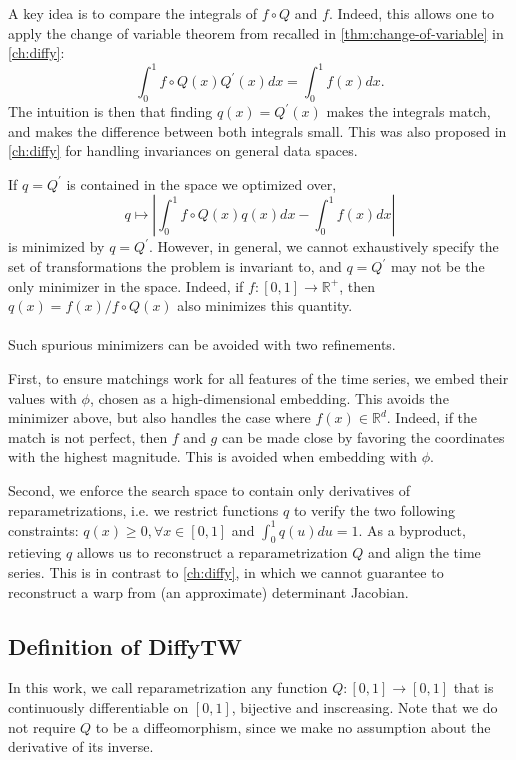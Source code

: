 A key idea is to compare the integrals of $f\circ Q$ and $f$. Indeed, this allows one to apply the change of variable theorem from \cite{aliprantis1998principles} recalled in \cref{thm:change-of-variable} in \cref{ch:diffy}:
\begin{equation}
    \int_0^1 f\circ Q(x)Q^\prime(x)dx = \int_0^1 f(x)dx.
\end{equation}
The intuition is then that finding $q(x) = Q^\prime(x)$ makes the integrals match, and makes the difference between both integrals small. This was also proposed in \cref{ch:diffy} for handling invariances on general data spaces.

If $q = Q^\prime$ is contained in the space we optimized over,
\begin{equation}
    q \mapsto \left\vert\int_0^1 f\circ Q(x)q(x) dx - \int_0^1 f(x)dx\right\vert
\end{equation}
is minimized by $q=Q^\prime$. However, in general, we cannot exhaustively specify the set of transformations the problem is invariant to, and $q=Q^\prime$ may not be the only minimizer in the space. Indeed, if $f:[0,1] \to \mathbb R^+$, then $q(x) = f(x) / f\circ Q(x)$ also minimizes this quantity.

\paragraph{}
Such spurious minimizers can be avoided with two refinements.

First, to ensure matchings work for all features of the time series, we embed their values with $\phi$, chosen as a high-dimensional embedding. This avoids the minimizer above, but also handles the case where $f(x)\in\mathbb R^d$. Indeed, if the match is not perfect, then $f$ and $g$ can be made close by favoring the coordinates with the highest magnitude. This is avoided when embedding with $\phi$.

Second, we enforce the search space to contain only derivatives of reparametrizations, i.e. we restrict functions $q$ to verify the two following constraints: $q(x) \geq 0, \forall x\in[0,1]$ and $\int_0^1 q(u)du=1$. As a byproduct, retieving $q$ allows us to reconstruct a reparametrization $Q$ and align the time series. This is in contrast to \cref{ch:diffy}, in which we cannot guarantee to reconstruct a warp from (an approximate) determinant Jacobian.

\subsection{Definition of DiffyTW}
In this work, we call reparametrization any function $Q: [0,1] \to [0,1]$ that is continuously differentiable on $[0,1]$, bijective and inscreasing. Note that we do not require $Q$ to be a diffeomorphism, since we make no assumption about the derivative of its inverse.

